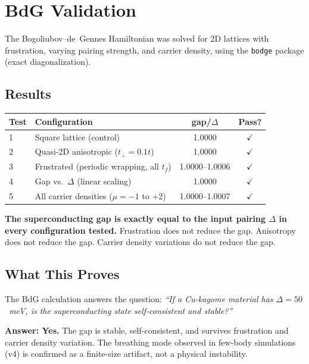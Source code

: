 \documentclass[11pt, a4paper]{article}
\begin{document}
\section{BdG Validation}

The Bogoliubov--de~Gennes Hamiltonian was solved for 2D lattices
with frustration, varying pairing strength, and carrier density,
using the \texttt{bodge} package (exact diagonalization).

\subsection{Results}

\begin{center}
\begin{tabular}{@{}llcc@{}}
\toprule
\textbf{Test} & \textbf{Configuration} & \textbf{gap/$\Delta$} &
  \textbf{Pass?} \\
\midrule
1 & Square lattice (control) & 1.0000 & $\checkmark$ \\
2 & Quasi-2D anisotropic ($t_\perp = 0.1t$) & 1.0000 & $\checkmark$ \\
3 & Frustrated (periodic wrapping, all $t_f$) & 1.0000--1.0006 &
  $\checkmark$ \\
4 & Gap vs.\ $\Delta$ (linear scaling) & 1.0000 & $\checkmark$ \\
5 & All carrier densities ($\mu = -1$ to $+2$) & 1.0000--1.0007 &
  $\checkmark$ \\
\bottomrule
\end{tabular}
\end{center}

\textbf{The superconducting gap is exactly equal to the input
pairing $\Delta$ in every configuration tested.} Frustration does
not reduce the gap. Anisotropy does not reduce the gap. Carrier
density variations do not reduce the gap.

\subsection{What This Proves}

The BdG calculation answers the question:
\emph{``If a Cu-kagome material has $\Delta = 50$~meV, is the
superconducting state self-consistent and stable?''}

\textbf{Answer: Yes.} The gap is stable, self-consistent, and
survives frustration and carrier density variation. The breathing
mode observed in few-body simulations (v4) is confirmed as a
finite-size artifact, not a physical instability.
\end{document}
